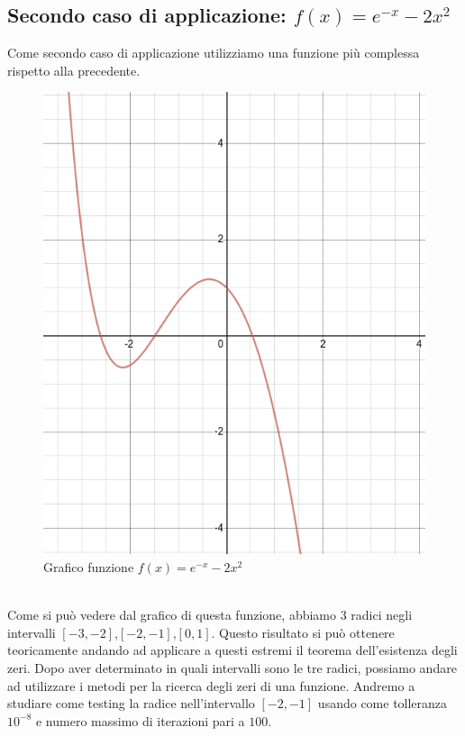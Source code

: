 \documentclass[12pt, letterpaper]{article}
\begin{document}
\newpage

\subsection{Secondo caso di applicazione: $f(x)=e^{-x}-2x^2$}
Come secondo caso di applicazione utilizziamo una funzione più complessa rispetto alla precedente.
\begin{figure}[ht!]
    \centering
    \includegraphics[scale=0.6]{Esponenziale.png}
    \caption{Grafico funzione $f(x)=e^{-x}-2x^2$}
\end{figure} \\

Come si può vedere dal grafico di questa funzione, abbiamo $3$ radici negli intervalli $[-3,-2]$,$[-2,-1]$,$[0,1]$.
Questo risultato si può ottenere teoricamente andando ad applicare a questi estremi il teorema dell’esistenza degli zeri.
Dopo aver determinato in quali intervalli sono le tre radici, possiamo andare ad utilizzare i metodi per la ricerca degli zeri di una funzione.
Andremo a studiare come testing la radice nell'intervallo $[-2,-1]$ usando come tolleranza $10^{-8}$ e numero massimo di iterazioni pari a $100$.
\newpage
\end{document}
